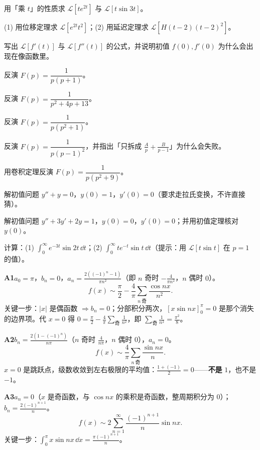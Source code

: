 \documentclass[11pt]{ctexart}
\begin{document}
用「乘 $t$」的性质求 $\mathcal L[te^{2t}]$ 与 $\mathcal L[t\sin 3t]$。

(1) 用位移定理求 $\mathcal L[e^{2t}t^2]$；(2) 用延迟定理求 $\mathcal L[H(t-2)(t-2)^2]$。

写出 $\mathcal L[f'(t)]$ 与 $\mathcal L[f''(t)]$ 的公式，并说明初值 $f(0),f'(0)$ 为什么会出现在像函数里。

反演 $F(p)=\dfrac{1}{p(p+1)}$。

反演 $F(p)=\dfrac{1}{p^2+4p+13}$。

反演 $F(p)=\dfrac{1}{p(p^2+1)}$。

反演 $F(p)=\dfrac{1}{p(p-1)^2}$，并指出「只拆成 $\frac{A}{p}+\frac{B}{p-1}$」为什么会失败。

用卷积定理反演 $F(p)=\dfrac{1}{p(p^2+9)}$。

解初值问题 $y''+y=0$，$y(0)=1$，$y'(0)=0$（要求走拉氏变换，不许直接猜）。

解初值问题 $y''+3y'+2y=1$，$y(0)=0$，$y'(0)=0$；并用初值定理核对 $y(0)$。

计算：(1) $\int_0^{\infty}e^{-3t}\sin 2t\,\dd t$；(2) $\int_0^{\infty}te^{-t}\sin t\,\dd t$（提示：用 $\mathcal L[t\sin t]$ 在 $p=1$ 的值）。

\newpage


\textbf{A1}\quad $a_0=\pi$，$b_n=0$，$a_n=\frac{2\left((-1)^n-1\right)}{\pi n^2}$（即 $n$ 奇时 $-\frac{4}{\pi n^2}$，$n$ 偶时 $0$）。
\[ f(x)\sim\frac{\pi}{2}-\frac{4}{\pi}\sum_{n\ \text{奇}}\frac{\cos nx}{n^2}. \]
关键一步：$|x|$ 是偶函数 $\Rightarrow b_n=0$；分部积分两次，$\left[x\sin nx\right]_0^\pi=0$ 是那个消失的边界项。代 $x=0$ 得 $0=\frac{\pi}{2}-\frac{4}{\pi}\sum_{\text{奇}}\frac{1}{n^2}$，即 $\sum_{\text{奇}}\frac{1}{n^2}=\frac{\pi^2}{8}$。

\textbf{A2}\quad $b_n=\frac{2\left(1-(-1)^n\right)}{n\pi}$（$n$ 奇时 $\frac{4}{n\pi}$，$n$ 偶时 $0$），$a_n=0$。
\[ f(x)\sim\frac{4}{\pi}\sum_{n\ \text{奇}}\frac{\sin nx}{n}. \]
$x=0$ 是跳跃点，级数收敛到左右极限的平均值：$\frac{1+(-1)}{2}=0$——\textbf{不是} $1$，也不是 $-1$。

\textbf{A3}\quad $a_n=0$（$x$ 是奇函数，与 $\cos nx$ 的乘积是奇函数，整周期积分为 $0$）；$b_n=\frac{2(-1)^{n+1}}{n}$。
\[ f(x)\sim 2\sum_{n=1}^{\infty}\frac{(-1)^{n+1}}{n}\sin nx. \]
关键一步：$\int_0^{\pi}x\sin nx\,\dd x=\frac{\pi(-1)^{n+1}}{n}$。
\end{document}
